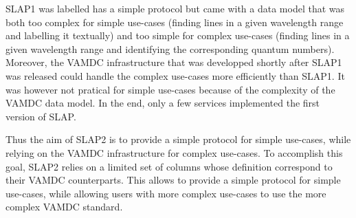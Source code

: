 \documentclass[11pt,a4paper]{ivoa}
\begin{document}
SLAP1 was labelled has a simple protocol but came with a data model that was
both too complex for simple use-cases (finding lines in a given wavelength range and labelling it textually) 
and too simple for complex use-cases  (finding lines in a given wavelength range and identifying the corresponding quantum numbers).
Moreover, the VAMDC infrastructure that was developped shortly after SLAP1 was released could handle the complex use-cases 
more efficiently than SLAP1. It was however not pratical for simple use-cases because of the complexity of the VAMDC data model. 
In the end, only a few services implemented the first version of SLAP.

Thus the aim of SLAP2 is to provide a simple protocol for simple use-cases, while relying on the VAMDC infrastructure for complex use-cases.
To accomplish this goal, SLAP2 relies on a limited set of columns whose definition correspond to their VAMDC counterparts. 
This allows to provide a simple protocol for simple use-cases, while allowing users with more complex use-cases 
to use the more complex VAMDC standard.




\end{document}
